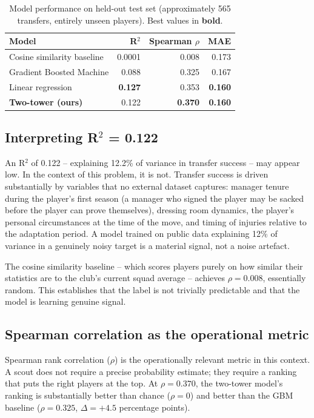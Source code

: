 \documentclass[12pt, a4paper, oneside]{report}
\begin{document}
\begin{table}[H]
\centering
\caption{Model performance on held-out test set (approximately 565 transfers, entirely unseen players). Best values in \textbf{bold}.}
\label{tab:benchmarks}
\begin{tabular}{lrrr}
\toprule
\textbf{Model} & \textbf{R$^2$} & \textbf{Spearman $\rho$} & \textbf{MAE} \\
\midrule
Cosine similarity baseline & 0.0001 & 0.008 & 0.173 \\
Gradient Boosted Machine   & 0.088  & 0.325 & 0.167 \\
Linear regression          & \textbf{0.127}  & 0.353 & \textbf{0.160} \\
\textbf{Two-tower (ours)}  & 0.122  & \textbf{0.370} & \textbf{0.160} \\
\bottomrule
\end{tabular}
\end{table}

\subsection{Interpreting R$^2$ = 0.122}

An R$^2$ of 0.122 -- explaining 12.2\% of variance in transfer success -- may appear low. In the context of this problem, it is not. Transfer success is driven substantially by variables that no external dataset captures: manager tenure during the player's first season (a manager who signed the player may be sacked before the player can prove themselves), dressing room dynamics, the player's personal circumstances at the time of the move, and timing of injuries relative to the adaptation period. A model trained on public data explaining 12\% of variance in a genuinely noisy target is a material signal, not a noise artefact.

The cosine similarity baseline -- which scores players purely on how similar their statistics are to the club's current squad average -- achieves $\rho = 0.008$, essentially random. This establishes that the label is not trivially predictable and that the model is learning genuine signal.

\subsection{Spearman correlation as the operational metric}

Spearman rank correlation ($\rho$) is the operationally relevant metric in this context. A scout does not require a precise probability estimate; they require a ranking that puts the right players at the top. At $\rho = 0.370$, the two-tower model's ranking is substantially better than chance ($\rho = 0$) and better than the GBM baseline ($\rho = 0.325$, $\Delta = +4.5$ percentage points).
\end{document}
